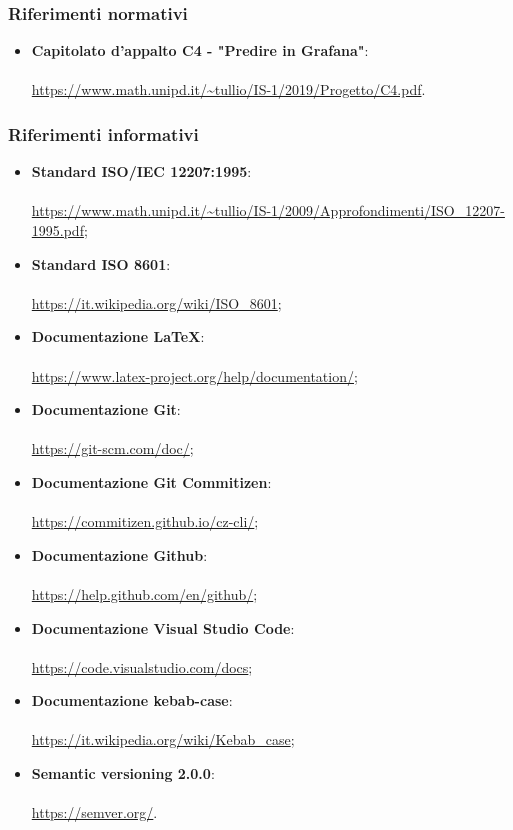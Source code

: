 \documentclass[../norme-di-progetto.tex]{subfiles}
\begin{document}
\subsubsection{Riferimenti normativi}
\begin{itemize}
  \item \textbf{Capitolato d'appalto C4 - "Predire in Grafana"}: \\ \\ \href{https://www.math.unipd.it/~tullio/IS-1/2019/Progetto/C4.pdf}{https://www.math.unipd.it/\textasciitilde tullio/IS-1/2019/Progetto/C4.pdf}.
\end{itemize}

\subsubsection{Riferimenti informativi}
\begin{itemize}
  \item \textbf{Standard ISO/IEC 12207:1995}: \\ \\ \href{https://www.math.unipd.it/~tullio/IS-1/2009/Approfondimenti/ISO_12207-1995.pdf}{https://www.math.unipd.it/\textasciitilde tullio/IS-1/2009/Approfondimenti/ISO\_12207-1995.pdf};
  \item \textbf{Standard ISO 8601}: \\ \\ \href{https://it.wikipedia.org/wiki/ISO_8601}{https://it.wikipedia.org/wiki/ISO\_8601};
\item \textbf{Documentazione \LaTeX}: \\ \\ \href{https://www.latex-project.org/help/documentation/}{https://www.latex-project.org/help/documentation/};
\item \textbf{Documentazione Git}: \\ \\ \href{https://git-scm.com/doc/}{https://git-scm.com/doc/};
\item \textbf{Documentazione Git Commitizen}: \\ \\ \href{https://commitizen.github.io/cz-cli/}{https://commitizen.github.io/cz-cli/};
\item \textbf{Documentazione Github}: \\ \\ \href{https://help.github.com/en/github/}{https://help.github.com/en/github/};
\item \textbf{Documentazione Visual Studio Code}: \\ \\ \href{https://code.visualstudio.com/docs}{https://code.visualstudio.com/docs};
\item \textbf{Documentazione kebab-case}: \\ \\ \href{https://it.wikipedia.org/wiki/Kebab_case}{https://it.wikipedia.org/wiki/Kebab\_case};
\item \textbf{Semantic versioning 2.0.0}: \\ \\ \href{https://semver.org/}{https://semver.org/}.
\end{itemize}
\end{document}
